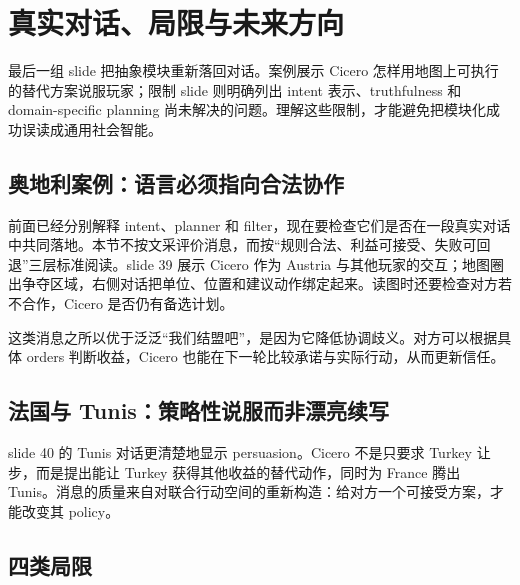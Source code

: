 \section{真实对话、局限与未来方向}

最后一组 slide 把抽象模块重新落回对话。案例展示 Cicero 怎样用地图上可执行的替代方案说服玩家；限制 slide 则明确列出 intent 表示、truthfulness 和 domain-specific planning 尚未解决的问题。理解这些限制，才能避免把模块化成功误读成通用社会智能。

\subsection{奥地利案例：语言必须指向合法协作}

前面已经分别解释 intent、planner 和 filter，现在要检查它们是否在一段真实对话中共同落地。本节不按文采评价消息，而按“规则合法、利益可接受、失败可回退”三层标准阅读。slide 39 展示 Cicero 作为 Austria 与其他玩家的交互；地图圈出争夺区域，右侧对话把单位、位置和建议动作绑定起来。读图时还要检查对方若不合作，Cicero 是否仍有备选计划。


这类消息之所以优于泛泛“我们结盟吧”，是因为它降低协调歧义。对方可以根据具体 orders 判断收益，Cicero 也能在下一轮比较承诺与实际行动，从而更新信任。

\subsection{法国与 Tunis：策略性说服而非漂亮续写}

slide 40 的 Tunis 对话更清楚地显示 persuasion。Cicero 不是只要求 Turkey 让步，而是提出能让 Turkey 获得其他收益的替代动作，同时为 France 腾出 Tunis。消息的质量来自对联合行动空间的重新构造：给对方一个可接受方案，才能改变其 policy。



\subsection{四类局限}

